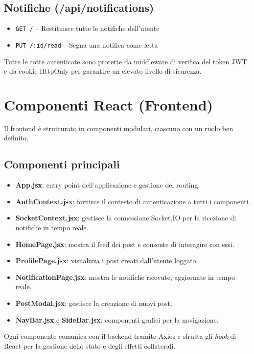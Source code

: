 \documentclass[a4paper,12pt]{article}
\begin{document}
\subsection{Notifiche (/api/notifications)}
\begin{itemize}
    \item \texttt{GET /} – Restituisce tutte le notifiche dell’utente
    \item \texttt{PUT /:id/read} – Segna una notifica come letta
\end{itemize}

Tutte le rotte autenticate sono protette da middleware di verifica del token JWT e da cookie HttpOnly per garantire un elevato livello di sicurezza.

\section{Componenti React (Frontend)}
Il frontend è strutturato in componenti modulari, ciascuno con un ruolo ben definito.

\subsection{Componenti principali}
\begin{itemize}
    \item \textbf{App.jsx}: entry point dell’applicazione e gestione del routing.
    \item \textbf{AuthContext.jsx}: fornisce il contesto di autenticazione a tutti i componenti.
    \item \textbf{SocketContext.jsx}: gestisce la connessione Socket.IO per la ricezione di notifiche in tempo reale.
    \item \textbf{HomePage.jsx}: mostra il feed dei post e consente di interagire con essi.
    \item \textbf{ProfilePage.jsx}: visualizza i post creati dall’utente loggato.
    \item \textbf{NotificationPage.jsx}: mostra le notifiche ricevute, aggiornate in tempo reale.
    \item \textbf{PostModal.jsx}: gestisce la creazione di nuovi post.
    \item \textbf{NavBar.jsx} e \textbf{SideBar.jsx}: componenti grafici per la navigazione.
\end{itemize}

Ogni componente comunica con il backend tramite Axios e sfrutta gli \textit{hook} di React per la gestione dello stato e degli effetti collaterali.
\end{document}
